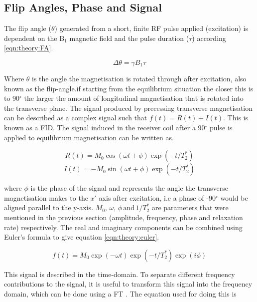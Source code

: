 \subsection{Flip Angles, Phase and Signal}

The flip angle ($\theta$) generated from a short, finite \ac{RF} pulse applied (excitation) is dependent on the B$_1$ magnetic field and the pulse duration ($\tau$) according \ref{eqn:theory:FA}.

\begin{equation}
    \Delta\theta = \gamma B_1 \tau
    \label{eqn:theory:FA}
\end{equation}

Where $\theta$ is the angle the magnetisation is rotated through after excitation, also known as the flip-angle.if starting from the equilibrium situation the closer this is to 90$^\circ$ the larger the amount of longitudinal magnetisation that is rotated into the transverse plane. The signal produced by precessing transverse magnetisation can be described as a complex signal such that $f(t) = R(t) + I(t)$. This is known as a \ac{FID}. The signal induced in the receiver coil after a 90$^\circ$ pulse is applied to equilibrium magnetisation can be written as.

\begin{equation}
    R(t) = M_0\cos(\omega t+ \phi)\exp(-t/T_2^*)
    \label{eqn:theory:real}
\end{equation}
\begin{equation}
    I(t) = -M_0\sin(\omega t+ \phi)\exp(-t/T_2^*)
    \label{eqn:theory:imag}
\end{equation}

\noindent where $\phi$ is the phase of the signal and represents the angle the transverse magnetisation makes to the $x'$ axis after excitation, i.e a phase of -90$^\circ$ would be aligned parallel to the y-axis. $M_0, \, \omega, \, \phi \, \textrm{and} \, 1/T_2^*$ are parameters that were mentioned in the previous section (amplitude, frequency, phase and relaxation rate) respectively. The real and imaginary components can be combined using Euler's formula to give equation \ref{eqn:theory:euler}. 

\begin{equation}
    f(t) = M_0\exp(-\omega t)\exp(-t/T_2^*)\exp(i\phi)
    \label{eqn:theory:euler}
\end{equation}

This signal is described in the time-domain. To separate different frequency contributions to the signal, it is useful to transform this signal into the frequency domain, which can be done using a \ac{FT} \cite{Fourier1822TheorieChaleur}. The equation used for doing this is

